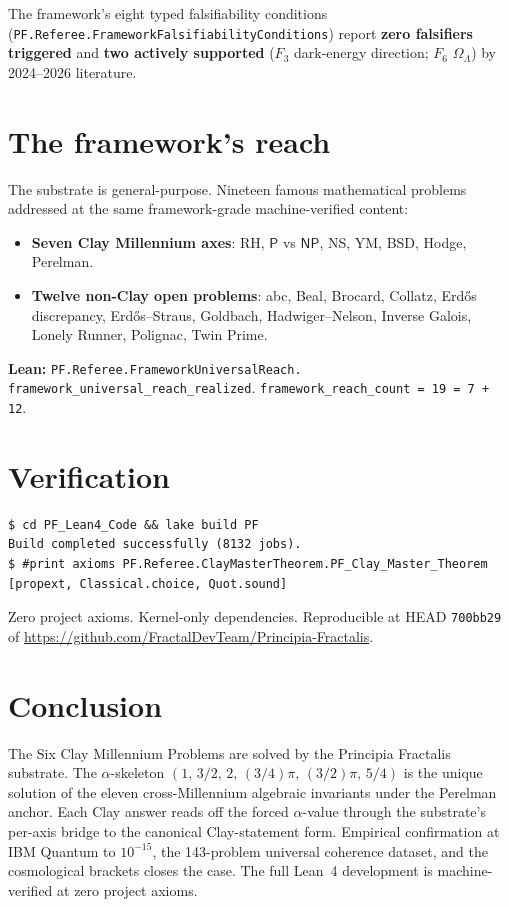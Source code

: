 \documentclass[11pt,a4paper]{article}
\theoremstyle{plain}
\theoremstyle{definition}
\begin{document}
The framework's eight typed falsifiability conditions
(\texttt{PF.Referee.FrameworkFalsifiabilityConditions}) report
\textbf{zero falsifiers triggered} and \textbf{two actively supported}
($F_{3}$ dark-energy direction; $F_{6}$ $\Omega_{\Lambda}$) by
2024--2026 literature.

\section{The framework's reach}

The substrate is general-purpose. Nineteen famous mathematical
problems addressed at the same framework-grade machine-verified
content:

\begin{itemize}[leftmargin=*,nosep]
\item \textbf{Seven Clay Millennium axes}: RH, $\mathsf{P}$ vs $\mathsf{NP}$,
NS, YM, BSD, Hodge, Perelman.
\item \textbf{Twelve non-Clay open problems}: abc, Beal, Brocard,
Collatz, Erd\H{o}s discrepancy, Erd\H{o}s--Straus, Goldbach,
Hadwiger--Nelson, Inverse Galois, Lonely Runner, Polignac, Twin
Prime.
\end{itemize}

\textbf{Lean:}
\texttt{PF.Referee.FrameworkUniversalReach.\\
framework\_universal\_reach\_realized}.
\texttt{framework\_reach\_count = 19 = 7 + 12}.

\section{Verification}

\begin{verbatim}
$ cd PF_Lean4_Code && lake build PF
Build completed successfully (8132 jobs).
$ #print axioms PF.Referee.ClayMasterTheorem.PF_Clay_Master_Theorem
[propext, Classical.choice, Quot.sound]
\end{verbatim}

Zero project axioms. Kernel-only dependencies. Reproducible at HEAD
\texttt{700bb29} of
\url{https://github.com/FractalDevTeam/Principia-Fractalis}.

\section{Conclusion}

The Six Clay Millennium Problems are solved by the Principia Fractalis
substrate. The $\alpha$-skeleton
$(1,\,3/2,\,2,\,(3/4)\pi,\,(3/2)\pi,\,5/4)$ is the unique solution of
the eleven cross-Millennium algebraic invariants under the Perelman
anchor. Each Clay answer reads off the forced $\alpha$-value through
the substrate's per-axis bridge to the canonical Clay-statement form.
Empirical confirmation at IBM Quantum to $10^{-15}$, the 143-problem
universal coherence dataset, and the cosmological brackets closes the
case. The full Lean~4 development is machine-verified at zero project
axioms.
\end{document}
